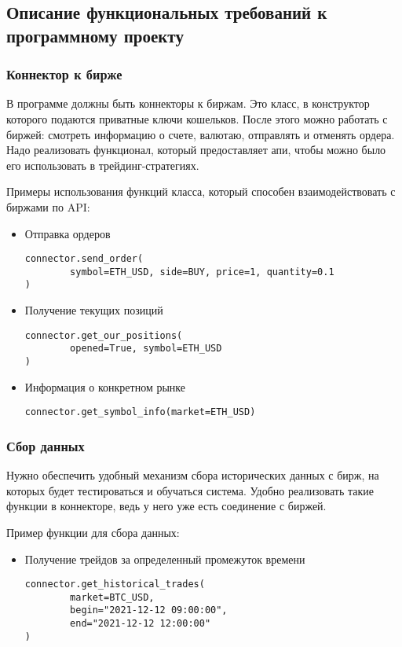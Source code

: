 \subsection{Описание функциональных требований к программному проекту}

\subsubsection{Коннектор к бирже}

В программе должны быть коннекторы к биржам. Это класс, в конструктор которого подаются приватные ключи кошельков. После этого можно работать с биржей: смотреть информацию о счете, валютаю, отправлять и отменять ордера. Надо реализовать функционал, который предоставляет апи, чтобы можно было его использовать в трейдинг-стратегиях.

Примеры использования функций класса, который способен взаимодействовать с биржами по API:

\begin{itemize}

\item Отправка ордеров
\begin{verbatim}
connector.send_order(
        symbol=ETH_USD, side=BUY, price=1, quantity=0.1
)
\end{verbatim}

\item Получение текущих позиций
\begin{verbatim}
connector.get_our_positions(
        opened=True, symbol=ETH_USD
)
\end{verbatim}

\item Информация о конкретном рынке
\begin{verbatim}
connector.get_symbol_info(market=ETH_USD)
\end{verbatim}

\end{itemize}

\subsubsection{Сбор данных}
Нужно обеспечить удобный механизм сбора исторических данных с бирж, на которых будет тестироваться и обучаться система. Удобно реализовать такие функции в коннекторе, ведь у него уже есть соединение с биржей.

Пример функции для сбора данных:
\begin{itemize}
\item Получение трейдов за определенный промежуток времени
\begin{verbatim}
connector.get_historical_trades(
        market=BTC_USD,
        begin="2021-12-12 09:00:00",
        end="2021-12-12 12:00:00"
)
\end{verbatim}
\end{itemize}


